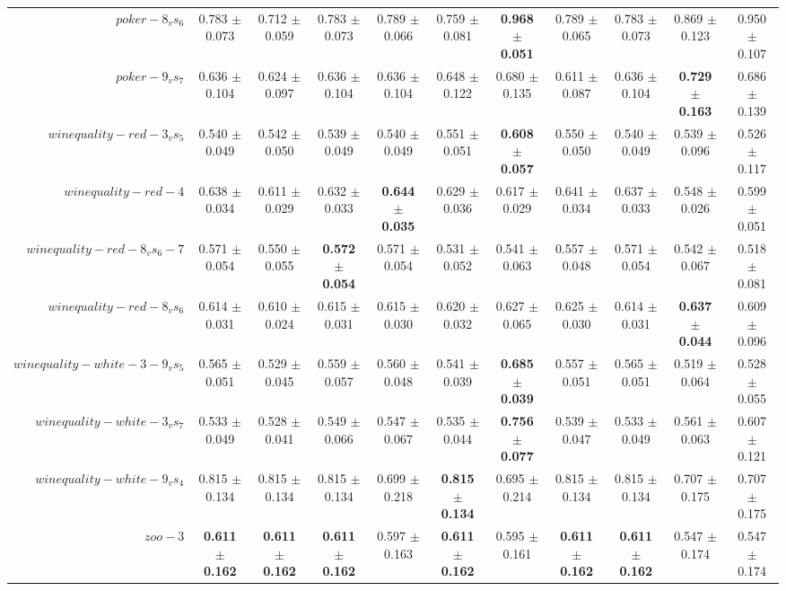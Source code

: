 \begin{table}[!ht]
{\begin{tabular}{r c c c c c c c c c c}
$poker-8_vs_6$ & 0.783 $\pm$ 0.073 & 0.712 $\pm$ 0.059 & 0.783 $\pm$ 0.073 & 0.789 $\pm$ 0.066 & 0.759 $\pm$ 0.081 & \textbf{0.968 $\pm$ 0.051} & 0.789 $\pm$ 0.065 & 0.783 $\pm$ 0.073 & 0.869 $\pm$ 0.123 & 0.950 $\pm$ 0.107 \\
$poker-9_vs_7$ & 0.636 $\pm$ 0.104 & 0.624 $\pm$ 0.097 & 0.636 $\pm$ 0.104 & 0.636 $\pm$ 0.104 & 0.648 $\pm$ 0.122 & 0.680 $\pm$ 0.135 & 0.611 $\pm$ 0.087 & 0.636 $\pm$ 0.104 & \textbf{0.729 $\pm$ 0.163} & 0.686 $\pm$ 0.139 \\
$winequality-red-3_vs_5$ & 0.540 $\pm$ 0.049 & 0.542 $\pm$ 0.050 & 0.539 $\pm$ 0.049 & 0.540 $\pm$ 0.049 & 0.551 $\pm$ 0.051 & \textbf{0.608 $\pm$ 0.057} & 0.550 $\pm$ 0.050 & 0.540 $\pm$ 0.049 & 0.539 $\pm$ 0.096 & 0.526 $\pm$ 0.117 \\
$winequality-red-4$ & 0.638 $\pm$ 0.034 & 0.611 $\pm$ 0.029 & 0.632 $\pm$ 0.033 & \textbf{0.644 $\pm$ 0.035} & 0.629 $\pm$ 0.036 & 0.617 $\pm$ 0.029 & 0.641 $\pm$ 0.034 & 0.637 $\pm$ 0.033 & 0.548 $\pm$ 0.026 & 0.599 $\pm$ 0.051 \\
$winequality-red-8_vs_6-7$ & 0.571 $\pm$ 0.054 & 0.550 $\pm$ 0.055 & \textbf{0.572 $\pm$ 0.054} & 0.571 $\pm$ 0.054 & 0.531 $\pm$ 0.052 & 0.541 $\pm$ 0.063 & 0.557 $\pm$ 0.048 & 0.571 $\pm$ 0.054 & 0.542 $\pm$ 0.067 & 0.518 $\pm$ 0.081 \\
$winequality-red-8_vs_6$ & 0.614 $\pm$ 0.031 & 0.610 $\pm$ 0.024 & 0.615 $\pm$ 0.031 & 0.615 $\pm$ 0.030 & 0.620 $\pm$ 0.032 & 0.627 $\pm$ 0.065 & 0.625 $\pm$ 0.030 & 0.614 $\pm$ 0.031 & \textbf{0.637 $\pm$ 0.044} & 0.609 $\pm$ 0.096 \\
$winequality-white-3-9_vs_5$ & 0.565 $\pm$ 0.051 & 0.529 $\pm$ 0.045 & 0.559 $\pm$ 0.057 & 0.560 $\pm$ 0.048 & 0.541 $\pm$ 0.039 & \textbf{0.685 $\pm$ 0.039} & 0.557 $\pm$ 0.051 & 0.565 $\pm$ 0.051 & 0.519 $\pm$ 0.064 & 0.528 $\pm$ 0.055 \\
$winequality-white-3_vs_7$ & 0.533 $\pm$ 0.049 & 0.528 $\pm$ 0.041 & 0.549 $\pm$ 0.066 & 0.547 $\pm$ 0.067 & 0.535 $\pm$ 0.044 & \textbf{0.756 $\pm$ 0.077} & 0.539 $\pm$ 0.047 & 0.533 $\pm$ 0.049 & 0.561 $\pm$ 0.063 & 0.607 $\pm$ 0.121 \\
$winequality-white-9_vs_4$ & 0.815 $\pm$ 0.134 & 0.815 $\pm$ 0.134 & 0.815 $\pm$ 0.134 & 0.699 $\pm$ 0.218 & \textbf{0.815 $\pm$ 0.134} & 0.695 $\pm$ 0.214 & 0.815 $\pm$ 0.134 & 0.815 $\pm$ 0.134 & 0.707 $\pm$ 0.175 & 0.707 $\pm$ 0.175 \\
$zoo-3$ & \textbf{0.611 $\pm$ 0.162} & \textbf{0.611 $\pm$ 0.162} & \textbf{0.611 $\pm$ 0.162} & 0.597 $\pm$ 0.163 & \textbf{0.611 $\pm$ 0.162} & 0.595 $\pm$ 0.161 & \textbf{0.611 $\pm$ 0.162} & \textbf{0.611 $\pm$ 0.162} & 0.547 $\pm$ 0.174 & 0.547 $\pm$ 0.174 \\

\end{tabular}}
\end{table}
